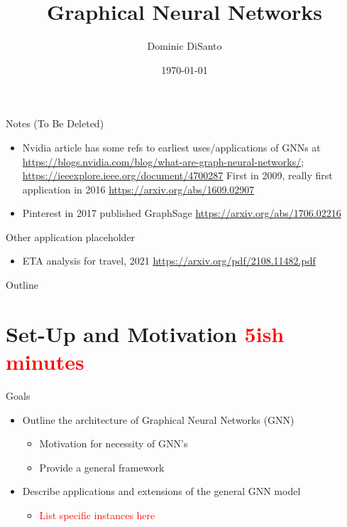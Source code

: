 \documentclass{beamer}
\title{Graphical Neural Networks}
\author{Dominic DiSanto}
\institute[]{Department of Biostatistics, Harvard University}
\date{\today}
\begin{document}
\begin{frame}{Notes (To Be Deleted)}
    \begin{itemize}
        \item Nvidia article has some refs to earliest uses/applications of GNNs at \url{https://blogs.nvidia.com/blog/what-are-graph-neural-networks/}; \url{https://ieeexplore.ieee.org/document/4700287} First in 2009, really first application in 2016 \url{https://arxiv.org/abs/1609.02907}
        \item Pinterest in 2017 published GraphSage \url{https://arxiv.org/abs/1706.02216}
    \end{itemize}
\end{frame}


\begin{frame}{Other application placeholder}
    \begin{itemize}
        \item ETA analysis for travel, 2021 \url{https://arxiv.org/pdf/2108.11482.pdf}
    \end{itemize}
\end{frame}


\begin{frame}
\maketitle
\end{frame}

\begin{frame}{Outline}
\tableofcontents 
\end{frame}


\section{Set-Up and Motivation \textcolor{red}{5ish minutes}}

\begin{frame}{Goals}
    \begin{itemize}\setlength\itemsep{8mm}
        \item Outline the architecture of Graphical Neural Networks (GNN)
        \begin{itemize}
            \item Motivation for necessity of GNN's 
            \item Provide a general framework
        \end{itemize}
        \item Describe applications and extensions of the general GNN model 
        \begin{itemize}
            \item \textcolor{red}{List specific instances here}
        \end{itemize}
    \end{itemize}
\end{frame}
\end{document}
